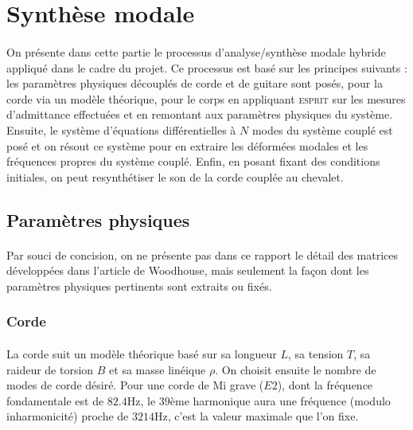 %
%
%
%


\section{Synthèse modale}

\paragraph{}
  On présente dans cette partie le processus d'analyse/synthèse modale hybride
appliqué dans le cadre du projet. Ce processus est basé sur les principes
suivants : les paramètres physiques découplés de corde et de guitare sont
posés, pour la corde via un modèle théorique, pour le corps en appliquant
\textsc{esprit} sur les mesures d'admittance effectuées et en remontant aux
paramètres physiques du système.
  Ensuite, le système d'équations différentielles à \( N \) modes du système
couplé est posé et on résout ce système pour en extraire les déformées modales
et les fréquences propres du système couplé. Enfin, en posant fixant des
conditions initiales, on peut resynthétiser le son de la corde couplée au
chevalet.

\subsection{Paramètres physiques}

\paragraph{}
Par souci de concision, on ne présente pas dans ce rapport le détail des
matrices développées dans l'article de Woodhouse, mais seulement la façon dont
les paramètres physiques pertinents sont extraits ou fixés.

\subsubsection{Corde}
  \paragraph{}
  La corde suit un modèle théorique basé sur sa longueur \( L \), sa tension
\( T \), sa raideur de torsion \( B \) et sa masse linéique \( \rho{} \).
  On choisit ensuite le nombre de modes de corde désiré.
  Pour une corde de Mi grave (\( E2 \)), dont la fréquence fondamentale est
de \( \si{82.4 \hertz}\), le \( 39 \)ème harmonique aura une fréquence (modulo 
inharmonicité) proche de \( \si{3214\hertz} \), c'est la valeur maximale que
l'on fixe.

